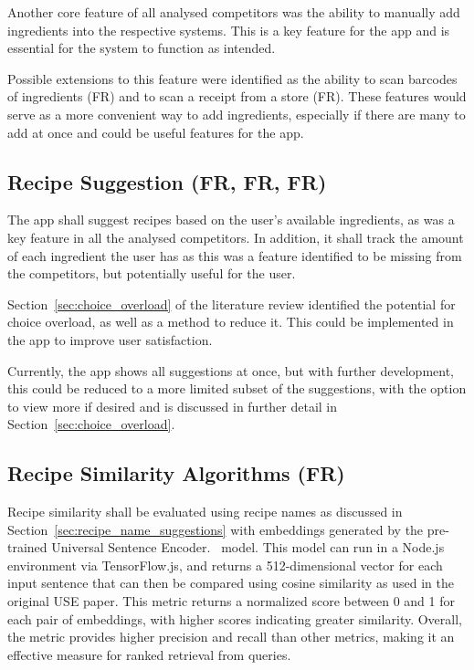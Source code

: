 Another core feature of all analysed competitors was the ability to manually add ingredients into the respective
systems. This is a key feature for the \chef{} app and is essential for the system to function as intended.

Possible extensions to this feature were identified as the ability to scan barcodes of ingredients (FR)
and to scan a receipt from a store (FR). These features would serve as a more convenient way to add
ingredients, especially if there are many to add at once and could be useful features for the \chef{} app.

\subsection{Recipe Suggestion (FR, FR, FR)}
The app shall suggest recipes based on the user's available ingredients, as was a key feature in
all the analysed competitors. In addition, it shall track the amount of each ingredient the user has
as this was a feature identified to be missing from the competitors, but potentially useful for the user.

Section~\ref{sec:choice_overload} of the literature review identified the potential for choice overload,
as well as a method to reduce it. This could be implemented in the \chef{} app to improve user satisfaction.

Currently, the app shows all suggestions at once, but with further development, this could be
reduced to a more limited subset of the suggestions, with the option to view more if desired and is
discussed in further detail in Section~\ref{sec:choice_overload}.

\subsection{Recipe Similarity Algorithms (FR)}\label{sec:recipe_similarity}

Recipe similarity shall be evaluated using recipe names as discussed in Section~\ref{sec:recipe_name_suggestions}
with embeddings generated by the pre-trained Universal Sentence Encoder.~\cite{cer_universal_2018} model.
This model can run in a Node.js environment via TensorFlow.js, and returns a 512-dimensional vector
for each input sentence that can then be compared using cosine similarity as used in the original
USE paper. This metric returns a normalized score between 0 and 1 for each pair of embeddings, with
higher scores indicating greater similarity. Overall, the metric provides higher precision and recall
than other metrics, making it an effective measure for ranked retrieval from queries.~\cite{ihajeer_comparison_2012}
